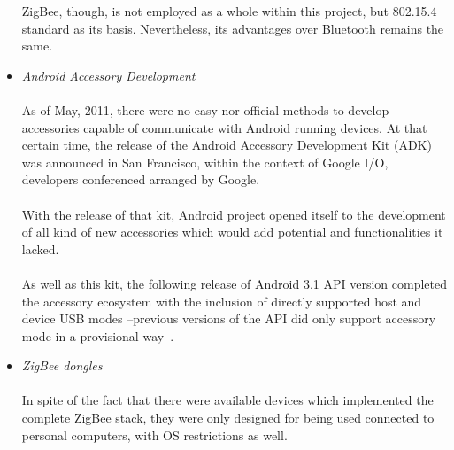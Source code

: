 \begin{itemize}
				ZigBee, though, is not employed as a whole within this project, but 802.15.4 standard as
				its basis. Nevertheless, its advantages over Bluetooth remains the same.\\
			\item \emph{Android Accessory Development}\\\\
				As of May, 2011, there were no easy nor official methods to develop
				accessories capable of communicate with Android running devices. At that
				certain time, the release of the Android Accessory Development Kit (ADK)
				was announced in San Francisco, within the context of Google I/O, developers
				conferenced arranged by Google.\\\\
				With the release of that kit, Android project opened itself to the development
				of all kind of new accessories which would add potential and functionalities
				it lacked.\\\\
				As well as this kit, the following release of Android 3.1 API version completed
				the accessory ecosystem with the inclusion of directly supported host and device
				USB modes --previous versions of the API did only support accessory mode in a 
				provisional way--.\\
			\item \emph{ZigBee dongles}\\\\
				In spite of the fact that there were available devices which implemented the complete ZigBee stack,
				they were only designed for being used connected to personal computers, with OS restrictions as well.\\
		\end{itemize}
	

